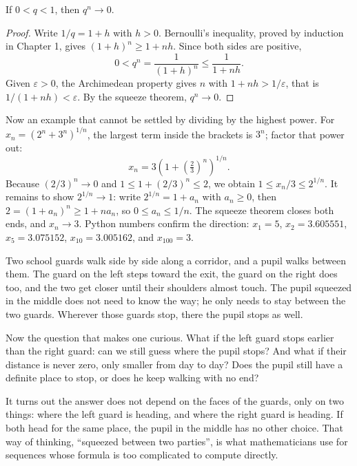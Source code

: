 \begin{lemma}
If $0<q<1$, then $q^n \to 0$.
\end{lemma}

\begin{proof}
Write $1/q=1+h$ with $h>0$. Bernoulli's inequality, proved by induction in Chapter
1, gives $(1+h)^n \ge 1+nh$. Since both sides are positive,
\[
0 < q^n = \frac{1}{(1+h)^n} \le \frac{1}{1+nh} .
\]
Given $\varepsilon>0$, the Archimedean property gives $n$ with $1+nh>1/\varepsilon$,
that is $1/(1+nh)<\varepsilon$. By the squeeze theorem, $q^n \to 0$.
\end{proof}

Now an example that cannot be settled by dividing by the highest power. For
$x_n=(2^n+3^n)^{1/n}$, the largest term inside the brackets is $3^n$; factor that
power out:
\[
x_n = 3\left(1+\left(\tfrac{2}{3}\right)^{n}\right)^{1/n}.
\]
Because $(2/3)^n \to 0$ and $1 \le 1+(2/3)^n \le 2$, we obtain
$1 \le x_n/3 \le 2^{1/n}$. It remains to show $2^{1/n} \to 1$: write
$2^{1/n}=1+a_n$ with $a_n \ge 0$, then
$2=(1+a_n)^n \ge 1+na_n$, so $0 \le a_n \le 1/n$. The squeeze theorem closes both
ends, and $x_n \to 3$. Python numbers confirm the direction:
$x_1=5$, $x_2=3.605551$, $x_5=3.075152$, $x_{10}=3.005162$, and $x_{100}=3$.

\begin{untukanak}
Two school guards walk side by side along a corridor, and a pupil walks between them.
The guard on the left steps toward the exit, the guard on the right does too, and the
two get closer until their shoulders almost touch. The pupil squeezed in the middle
does not need to know the way; he only needs to stay between the two guards. Wherever
those guards stop, there the pupil stops as well.

Now the question that makes one curious. What if the left guard stops earlier than
the right guard: can we still guess where the pupil stops? And what if their distance
is never zero, only smaller from day to day? Does the pupil still have a definite
place to stop, or does he keep walking with no end?

It turns out the answer does not depend on the faces of the guards, only on two
things: where the left guard is heading, and where the right guard is heading. If
both head for the same place, the pupil in the middle has no other choice. That way
of thinking, ``squeezed between two parties'', is what mathematicians use for
sequences whose formula is too complicated to compute directly.
\end{untukanak}

